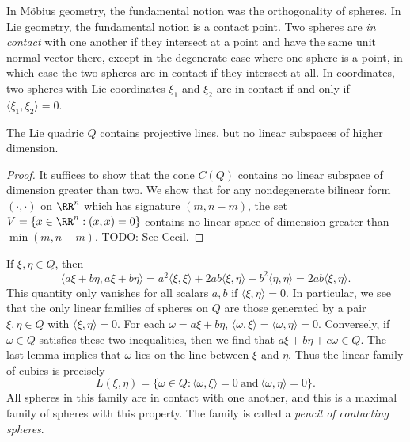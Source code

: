 In M\"{o}bius geometry, the fundamental notion was the orthogonality of spheres. In Lie geometry, the fundamental notion is a contact point. Two spheres are \emph{in contact} with one another if they intersect at a point and have the same unit normal vector there, except in the degenerate case where one sphere is a point, in which case the two spheres are in contact if they intersect at all. In coordinates, two spheres with Lie coordinates $\xi_1$ and $\xi_2$ are in contact if and only if $\langle \xi_1, \xi_2 \rangle = 0$.

\begin{lemma}
    The Lie quadric $Q$ contains projective lines, but no linear subspaces of higher dimension.
\end{lemma}
\begin{proof}
    It suffices to show that the cone $C(Q)$ contains no linear subspace of dimension greater than two. We show that for any nondegenerate bilinear form $(\cdot,\cdot)$ on $\RR^n$ which has signature $(m,n-m)$, the set $V = \{ x \in \RR^n : (x,x) = 0 \}$ contains no linear space of dimension greater than $\min(m,n-m)$. TODO: See Cecil.
\end{proof}

If $\xi, \eta \in Q$, then
%
\[ \langle a\xi + b\eta, a\xi + b\eta \rangle = a^2 \langle \xi,\xi \rangle + 2ab \langle \xi, \eta \rangle + b^2 \langle \eta, \eta \rangle = 2ab \langle \xi, \eta \rangle. \]
%
This quantity only vanishes for all scalars $a,b$ if $\langle \xi, \eta \rangle = 0$. In particular, we see that the only linear families of spheres on $Q$ are those generated by a pair $\xi,\eta \in Q$ with $\langle \xi, \eta \rangle = 0$. For each $\omega = a\xi + b\eta$, $\langle \omega, \xi \rangle = \langle \omega, \eta \rangle = 0$. Conversely, if $\omega \in Q$ satisfies these two inequalities, then we find that $a\xi + b \eta + c \omega \in Q$. The last lemma implies that $\omega$ lies on the line between $\xi$ and $\eta$. Thus the linear family of cubics is precisely
%
\[ L(\xi,\eta) = \{ \omega \in Q: \langle \omega, \xi \rangle = 0\ \text{and}\ \langle \omega, \eta \rangle = 0 \}. \]
%
All spheres in this family are in contact with one another, and this is a maximal family of spheres with this property. The family is called a \emph{pencil of contacting spheres}.


